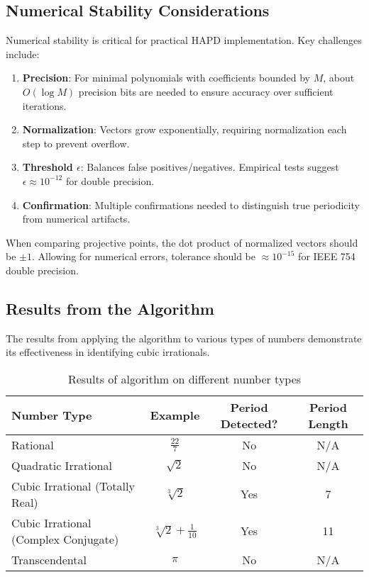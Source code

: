 \subsection{Numerical Stability Considerations}

Numerical stability is critical for practical HAPD implementation. Key challenges include:

\begin{enumerate}
\item \textbf{Precision}: For minimal polynomials with coefficients bounded by $M$, about $O(\log M)$ precision bits are needed to ensure accuracy over sufficient iterations.

\item \textbf{Normalization}: Vectors grow exponentially, requiring normalization each step to prevent overflow.

\item \textbf{Threshold $\epsilon$}: Balances false positives/negatives. Empirical tests suggest $\epsilon \approx 10^{-12}$ for double precision.

\item \textbf{Confirmation}: Multiple confirmations needed to distinguish true periodicity from numerical artifacts.
\end{enumerate}

When comparing projective points, the dot product of normalized vectors should be $\pm 1$. Allowing for numerical errors, tolerance should be $\approx 10^{-15}$ for IEEE 754 double precision.

\subsection{Results from the \HAPD{} Algorithm}

The results from applying the \HAPD{} algorithm to various types of numbers demonstrate its effectiveness in identifying cubic irrationals.

\begin{table}[htbp]
\centering
\begin{tabular}{|l|c|c|c|}
\hline
\textbf{Number Type} & \textbf{Example} & \textbf{Period Detected?} & \textbf{Period Length} \\
\hline
Rational & $\frac{22}{7}$ & No & N/A \\
\hline
Quadratic Irrational & $\sqrt{2}$ & No & N/A \\
\hline
Cubic Irrational (Totally Real) & $\sqrt[3]{2}$ & Yes & 7 \\
\hline
Cubic Irrational (Complex Conjugate) & $\sqrt[3]{2} + \frac{1}{10}$ & Yes & 11 \\
\hline
Transcendental & $\pi$ & No & N/A \\
\hline
\end{tabular}
\caption{Results of \HAPD{} algorithm on different number types}
\label{tab:hapd_results}
\end{table}

